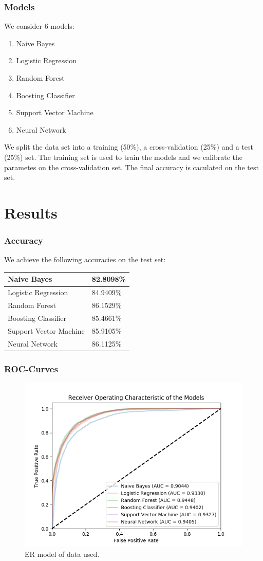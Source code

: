 \documentclass[xcolor=sgvnames,serifs,notes,compress,professionalfont]{beamer}
\begin{document}
\begin{frame}
\frametitle{Models}
We consider 6 models:
\begin{enumerate}
	\item Naive Bayes
	\item Logistic Regression
	\item Random Forest
	\item Boosting Classifier
	\item Support Vector Machine
	\item Neural Network
\end{enumerate}
We split the data set into a training (50\%), a cross-validation (25\%) and a test (25\%) set. The training set is used to train the models and we calibrate the parametes on the cross-validation set. The final accuracy is caculated on the test set.
\end{frame}

\section{Results}
\begin{frame}
\frametitle{Accuracy}
We achieve the following accuracies on the test set:
\begin{table}
	\begin{tabular}{|l|l|}
		\hline
		Naive Bayes & 82.8098\%\\\hline
		Logistic Regression & 84.9409\%\\\hline
		Random Forest & 86.1529\%\\\hline
		Boosting Classifier & 85.4661\%\\\hline
		Support Vector Machine &  85.9105\%\\\hline
		Neural Network & 86.1125\%\\
		\hline 
	\end{tabular}
\end{table}
\end{frame}

\begin{frame}
\frametitle{ROC-Curves}
\begin{figure}
	\includegraphics[height=0.75\textheight]{pictures/rocs.png}    
	\caption{ER model of data used.}
\end{figure}
\end{frame}
\end{document}

